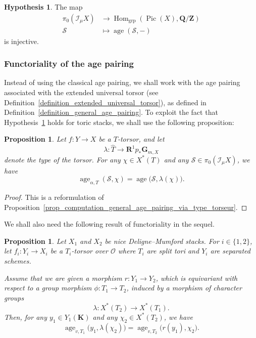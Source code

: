 \documentclass{proc-l}
\newcommand{\R}{\mathbf{R}}
\newcommand{\Z}{\mathbf{Z}}
\newcommand{\K}{\mathbf{K}}
\newcommand{\Q}{\mathbf{Q}}
\newcommand{\G}{\mathbf{G}}
\DeclareMathOperator{\Pic}{Pic}
\DeclareMathOperator{\grp}{grp}
\DeclareMathOperator{\Hom}{Hom}
\DeclareMathOperator{\age}{age}
\DeclareMathOperator{\NS}{NS}
\DeclareMathOperator{\orb}{orb}
\newcommand{\stackS}{\mathcal{S}}
\newcommand{\sheafI}{\mathcal{I}}
\newcommand{\sheafO}{\mathcal{O}}
\newcommand{\sector}{\pi_0(\sheafI_{\mu} X)}
\newtheorem{prop}[theorem]{Proposition}
\theoremstyle{definition}
\newtheorem{hypothesis}[theorem]{Hypothesis}
\theoremstyle{remark}
\numberwithin{equation}{section}
\begin{document}
\begin{hypothesis}\label{hypothesis_sectors_dual_picard_group}
The map
\begin{align*}
\sector &\longrightarrow \Hom_{\grp}(\Pic(X),\Q/\Z) \\
\stackS &\longmapsto \age(\stackS,-)
\end{align*}
is injective.
\end{hypothesis}




\subsubsection{Functoriality of the age pairing}




Instead of using the classical age pairing, we shall work with the age pairing associated with the extended universal torsor (see Definition~\ref{definition_extended_universal_torsor}), as defined in Definition~\ref{definition_general_age_pairing}. To exploit the fact that Hypothesis~\ref{hypothesis_sectors_dual_picard_group} holds for toric stacks, we shall use the following proposition:

\begin{prop}\label{prop_age_functoriality_torsor}
Let $f : Y \rightarrow X$ be a $T$-torsor, and let
\[
\lambda : \widehat{T} \longrightarrow \R^{1} p_{*}\G_{m,X}
\]
denote the type of the torsor. For any $\chi \in X^{*}(T)$ and any
$\stackS \in \sector$, we have
\[
\age_{\alpha,T}(\stackS,\chi) = \age\bigl(\stackS,\lambda(\chi)\bigr).
\]
\end{prop}

\begin{proof}
This is a reformulation of Proposition~\ref{prop_computation_general_age_pairing_via_type_torseur}.
\end{proof}

We shall also need the following result of functoriality in the sequel.

\begin{prop}\label{prop_functoriality_lif_age}
Let $X_1$ and $X_2$ be nice Deligne--Mumford stacks. For $i \in \{1,2\}$, let
$f_i : Y_i \rightarrow X_i$ be a $T_i$-torsor over $\sheafO$ where $T_i$ are split tori and $Y_i$ are separated schemes.

Assume that we are given a morphism $r : Y_1 \rightarrow Y_2$, which is equivariant
with respect to a group morphism $\phi : T_1 \rightarrow T_2$, induced by a
morphism of character groups
\[
\lambda : X^{*}(T_2) \longrightarrow X^{*}(T_1).
\]
Then, for any $y_1 \in Y_1(\K)$ and any $\chi_2 \in X^{*}(T_2)$, we have
\[
\age_{v,T_1}\bigl(y_1,\lambda(\chi_2)\bigr)
=
\age_{v,T_2}\bigl(r(y_1),\chi_2\bigr).
\]
\end{prop}
\end{document}
